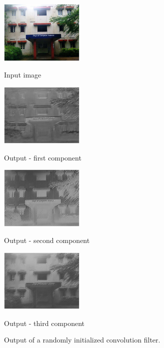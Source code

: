 \documentclass[a4paper]{article}
\begin{document}
\begin{figure}[t]

\begin{minipage}[b]{.48\linewidth}
  \centering
  \centerline{\includegraphics[width=4.0cm]{Figures/org}}
  \centerline{Input image}\medskip
\end{minipage}
%
\begin{minipage}[b]{.48\linewidth}
  \centering
  \centerline{\includegraphics[width=4.0cm]{Figures/first}}
  \centerline{Output - first component }\medskip
\end{minipage}
\hfill
\begin{minipage}[b]{0.48\linewidth}
  \centering
  \centerline{\includegraphics[width=4.0cm]{Figures/second}}
  \centerline{Output - second component}\medskip
\end{minipage}
%
\begin{minipage}[b]{0.48\linewidth}
  \centering
  \centerline{\includegraphics[width=4.0cm]{Figures/third}}
  \centerline{Output - third component}\medskip
\end{minipage}
%
\caption{Output of a randomly initialized convolution filter.
}
\label{fig:res}
%
\end{figure}
\end{document}
